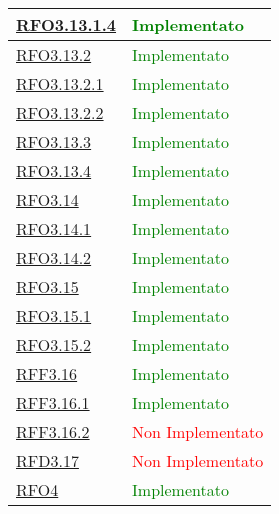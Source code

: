 \begin{longtable}{|>{\centering}m{5cm}|m{5cm}<{\centering}|}
\hyperlink{RFO3.13.1.4}{RFO3.13.1.4} &  \textcolor{green}{Implementato}\\ \hline

\hyperlink{RFO3.13.2}{RFO3.13.2} & \textcolor{green}{Implementato}\\ \hline

\hyperlink{RFO3.13.2.1}{RFO3.13.2.1} &  \textcolor{green}{Implementato}\\ \hline

\hyperlink{RFO3.13.2.2}{RFO3.13.2.2} &  \textcolor{green}{Implementato}\\ \hline

\hyperlink{RFO3.13.3}{RFO3.13.3} & \textcolor{green}{Implementato}\\ \hline

\hyperlink{RFO3.13.4}{RFO3.13.4} &  \textcolor{green}{Implementato}\\ \hline

\hyperlink{RFO3.14}{RFO3.14} & \textcolor{green}{Implementato}\\ \hline

\hyperlink{RFO3.14.1}{RFO3.14.1} &  \textcolor{green}{Implementato}\\ \hline

\hyperlink{RFO3.14.2}{RFO3.14.2} &   \textcolor{green}{Implementato}\\ \hline

\hyperlink{RFO3.15}{RFO3.15} &   \textcolor{green}{Implementato}\\ \hline

\hyperlink{RFO3.15.1}{RFO3.15.1} &   \textcolor{green}{Implementato}\\ \hline

\hyperlink{RFO3.15.2}{RFO3.15.2} &  \textcolor{green}{Implementato}\\ \hline

\hyperlink{RFF3.16}{RFF3.16} & \textcolor{green}{Implementato}\\ \hline

\hyperlink{RFF3.16.1}{RFF3.16.1} &   \textcolor{green}{Implementato}\\ \hline

\hyperlink{RFF3.16.2}{RFF3.16.2} &  \textcolor{red}{Non Implementato}\\ \hline

\hyperlink{RFD3.17}{RFD3.17} &   \textcolor{red}{Non Implementato}\\ \hline

\hyperlink{RFO4}{RFO4} & \textcolor{green}{Implementato}\\ \hline


\end{longtable}
